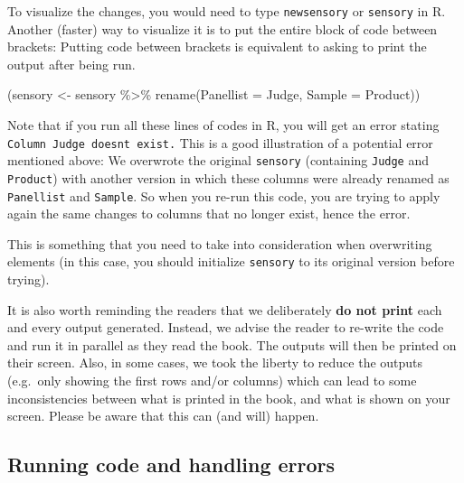 \documentclass[
]{krantz}
\makeatletter
\newenvironment{Shaded}{\begin{snugshade}}{\end{snugshade}}
\newcommand{\AttributeTok}[1]{\textcolor[rgb]{0.61,0.61,0.61}{#1}}
\newcommand{\FunctionTok}[1]{\textcolor[rgb]{0,0,0}{#1}}
\newcommand{\NormalTok}[1]{#1}
\newcommand{\OtherTok}[1]{\textcolor[rgb]{0.37,0.37,0.37}{#1}}
\newcommand{\SpecialCharTok}[1]{\textcolor[rgb]{0,0,0}{#1}}
\renewenvironment{quote}{\begin{VF}}{\end{VF}}
\newenvironment{kframe}{%
\medskip{}
\setlength{\fboxsep}{.8em}
 \def\at@end@of@kframe{}%
 \ifinner\ifhmode%
  \def\at@end@of@kframe{\end{minipage}}%
  \begin{minipage}{\columnwidth}%
 \fi\fi%
 \def\FrameCommand##1{\hskip\@totalleftmargin \hskip-\fboxsep
 \colorbox{shadecolor}{##1}\hskip-\fboxsep
     \hskip-\linewidth \hskip-\@totalleftmargin \hskip\columnwidth}%
 \MakeFramed {\advance\hsize-\width
   \@totalleftmargin\z@ \linewidth\hsize
   \@setminipage}}%
 {\par\unskip\endMakeFramed%
 \at@end@of@kframe}
\renewenvironment{Shaded}{\begin{kframe}}{\end{kframe}}
\makeatother
\begin{document}
To visualize the changes, you would need to type \texttt{newsensory} or \texttt{sensory} in R.
Another (faster) way to visualize it is to put the entire block of code between brackets: Putting code between brackets is equivalent to asking to print the output after being run.

\begin{Shaded}
\begin{Highlighting}[]
\NormalTok{(sensory }\OtherTok{\textless{}{-}}\NormalTok{ sensory }\SpecialCharTok{\%\textgreater{}\%} 
  \FunctionTok{rename}\NormalTok{(}\AttributeTok{Panellist =}\NormalTok{ Judge, }\AttributeTok{Sample =}\NormalTok{ Product))}
\end{Highlighting}
\end{Shaded}

Note that if you run all these lines of codes in R, you will get an error stating \texttt{Column\ \textquotesingle{}Judge\textquotesingle{}\ doesn\textquotesingle{}t\ exist.} This is a good illustration of a potential error mentioned above: We overwrote the original \texttt{sensory} (containing \texttt{Judge} and \texttt{Product}) with another version in which these columns were already renamed as \texttt{Panellist} and \texttt{Sample}. So when you re-run this code, you are trying to apply again the same changes to columns that no longer exist, hence the error.

This is something that you need to take into consideration when overwriting elements (in this case, you should initialize \texttt{sensory} to its original version before trying).

\begin{quote}
It is also worth reminding the readers that we deliberately \textbf{do not print} each and every output generated. Instead, we advise the reader to re-write the code and run it in parallel as they read the book. The outputs will then be printed on their screen. Also, in some cases, we took the liberty to reduce the outputs (e.g.~only showing the first rows and/or columns) which can lead to some inconsistencies between what is printed in the book, and what is shown on your screen. Please be aware that this can (and will) happen.
\end{quote}

\hypertarget{running-code-and-handling-errors}{%
\subsection{Running code and handling errors}\label{running-code-and-handling-errors}}
\end{document}

